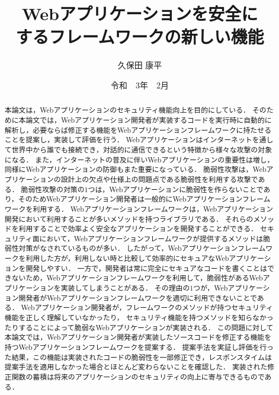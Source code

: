 \documentclass[a4paper,12pt]{jreport}
\title{Webアプリケーションを安全に\\するフレームワークの新しい機能}
\author{久保田 康平}
\date{令和　3年　2月}
\begin{document}
\maketitle

\begin{abstract}
本論文は，Webアプリケーションのセキュリティ機能向上を目的にしている．
そのために本論文では，Webアプリケーション開発者が実装するコードを実行時に自動的に解析し，必要ならば修正する機能をWebアプリケーションフレームワークに持たせることを提案し，実装して評価を行う．
Webアプリケーションはインターネットを通して世界中から誰でも接続でき，対話的に通信できるという特徴から様々な攻撃の対象になる．
また，インターネットの普及に伴いWebアプリケーションの重要性は増し，同様にWebアプリケーションの防御もまた重要になっている．
脆弱性攻撃は，Webアプリケーションの設計上の欠点や仕様上の問題点である脆弱性を利用する攻撃である．
脆弱性攻撃の対策の1つは，Webアプリケーションに脆弱性を作らないことであり，そのためWebアプリケーション開発者は一般的にWebアプリケーションフレームワーク\cite{weinberger2011systematic, bottle, flask}を利用する．
Webアプリケーションフレームワークは，Webアプリケーション開発において利用することが多いメソッドを持つライブラリである．
それらのメソッドを利用することで効率よく安全なアプリケーションを開発することができる．
セキュリティ面において，Webアプリケーションフレームワークが提供するメソッドは脆弱性対策がなされているものが多い．
したがって，Webアプリケーションフレームワークを利用した方が，利用しない時と比較して効率的にセキュアなWebアプリケーションを開発しやすい．
一方で，開発者は常に完全にセキュアなコードを書くことはできないため，Webアプリケーションフレームワークを利用して，脆弱性があるWebアプリケーションを実装してしまうことがある．
その理由の1つが，Webアプリケーション開発者がWebアプリケーションフレームワークを適切に利用できないことである．
Webアプリケーション開発者が，フレームワークのメソッドが持つセキュリティ機能を正しく理解していなかったり，
セキュリティ機能を持つメソッドを知らなかったりすることによって脆弱なWebアプリケーションが実装される．
この問題に対して本論文では，Webアプリケーション開発者が実装したソースコードを修正する機能を持つWebアプリケーションフレームワークを提案する．
提案手法を実証し評価を行った結果，この機能は実装されたコードの脆弱性を一部修正でき，レスポンスタイムは提案手法を適用しなかった場合とほとんど変わらないことを確認した．
実装された修正関数の蓄積は将来のアプリケーションのセキュリティの向上に寄与できるものである．
\end{abstract}

\tableofcontents
\listoffigures
\newpage
{}
\end{document}
